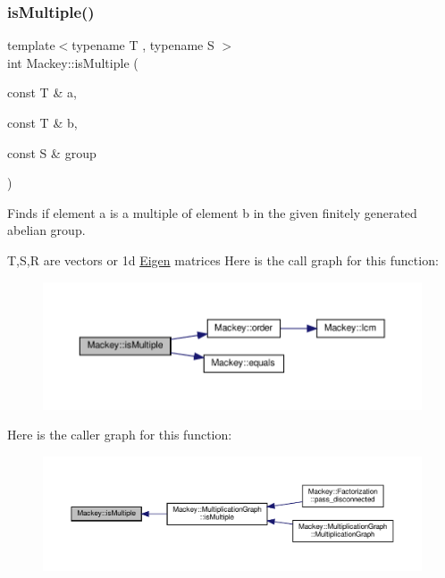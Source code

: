 \subsubsection{\texorpdfstring{is\+Multiple()}{isMultiple()}}
{\footnotesize\ttfamily template$<$typename T , typename S $>$ \\
int Mackey\+::is\+Multiple (\begin{DoxyParamCaption}\item[{const T \&}]{a,  }\item[{const T \&}]{b,  }\item[{const S \&}]{group }\end{DoxyParamCaption})}



Finds if element a is a multiple of element b in the given finitely generated abelian group. 

T,S,R are vectors or 1d \hyperlink{namespaceEigen}{Eigen} matrices Here is the call graph for this function\+:\nopagebreak
\begin{figure}[H]
\begin{center}
\leavevmode
\includegraphics[width=350pt]{namespaceMackey_aef81f82c080c97bb31154524af52b62c_cgraph}
\end{center}
\end{figure}
Here is the caller graph for this function\+:\nopagebreak
\begin{figure}[H]
\begin{center}
\leavevmode
\includegraphics[width=350pt]{namespaceMackey_aef81f82c080c97bb31154524af52b62c_icgraph}
\end{center}
\end{figure}
\mbox{\label{namespaceMackey_a4c3647777bc890a4649ae24b138bbb79}} 
